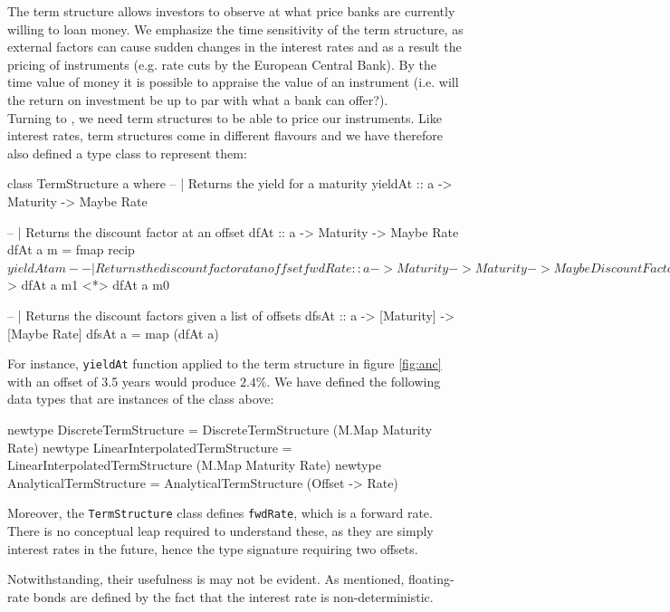 The term structure allows investors to observe at what price banks are
currently willing to loan money. We emphasize the time sensitivity of the term
structure, as external factors can cause sudden changes in the interest
rates and as a result the pricing of instruments (e.g. rate cuts by the
European Central Bank). By the time value of money it is possible to
appraise the value of an instrument (i.e. will the return on investment
be up to par with what a bank can offer?).\\

Turning to \hql, we need term structures to be able to price our instruments.
Like interest rates, term structures come in different flavours and we 
have therefore also defined a type class to represent them:

\begin{hscode}
class TermStructure a where
  -- | Returns the yield for a maturity
  yieldAt :: a -> Maturity -> Maybe Rate

  -- | Returns the discount factor at an offset
  dfAt :: a -> Maturity -> Maybe Rate
  dfAt a m = fmap recip $ yieldAt a m
 
  -- | Returns the discount factor at an offset
  fwdRate :: a -> Maturity -> Maturity -> Maybe DiscountFactor
  fwdRate a m0 m1 = (/) <$> dfAt a m1 <*> dfAt a m0
  
  -- | Returns the discount factors given a list of offsets
  dfsAt :: a -> [Maturity] -> [Maybe Rate]
  dfsAt a = map (dfAt a)
\end{hscode}

For instance, \texttt{yieldAt} function applied to the term structure in
figure \ref{fig:anc} with an offset of 3.5 years would produce $2.4\%$. We have
defined the following data types that are instances of the class above:

\begin{hscode}
newtype DiscreteTermStructure
  = DiscreteTermStructure (M.Map Maturity Rate)
newtype LinearInterpolatedTermStructure
  = LinearInterpolatedTermStructure (M.Map Maturity Rate)
newtype AnalyticalTermStructure
  = AnalyticalTermStructure (Offset -> Rate)
\end{hscode}

Moreover, the \texttt{TermStructure} class defines \texttt{fwdRate}, which
is a forward rate. There is no conceptual leap required to understand these,
as they are simply interest rates in the future, hence the type signature
requiring two offsets.

Notwithstanding, their usefulness is may not be evident. As mentioned, 
floating-rate bonds are defined by the fact that the interest rate is
non-deterministic. 

